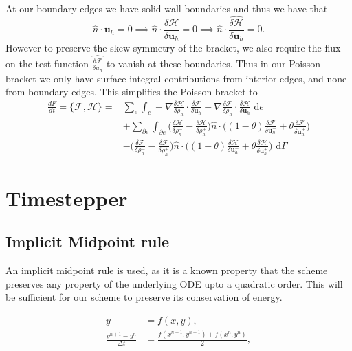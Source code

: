 \documentclass[a4paper,11pt]{article}
\begin{document}
 At our boundary edges we have solid wall boundaries and thus we have that 
\[\hat{\underline{n}} \cdot \mathbf{u}_h = 0 \implies  \hat{\underline{n}} \cdot \frac{\delta  \mathcal{H}}{\delta \mathbf{u}_h}= 0 \implies  \hat{\underline{n}} \cdot \widehat{\frac{\delta  \mathcal{H}}{\delta \mathbf{u}_h}} = 0.\]
However to preserve the skew symmetry of the bracket, we also require the flux on the test function $  \widehat{\frac{\delta  \mathcal{F}}{\delta u_h}}$ to vanish at these boundaries. Thus in our Poisson bracket we only have surface integral contributions from interior edges, and none from boundary edges.
 This simplifies the Poisson bracket to 
 \begin{equation}\label{eqns:discretepb}
\begin{aligned}
\frac{dF}{dt} =  \{ \mathcal{F},  \mathcal{H}\} = &  \sum_e \int_e - \nabla \frac{\delta  \mathcal{H}}{\delta \rho_h}\cdot \frac{\delta  \mathcal{F}}{\delta \mathbf{u}_h} + \nabla \frac{\delta  \mathcal{F}}{\delta \rho_h}\cdot \frac{\delta  \mathcal{H}}{\delta \mathbf{u}_h} \text{ d}e \\
 &+ \sum_{\partial e} \int_{\partial e } \bigg(  \frac{\delta  \mathcal{H}}{\delta \rho_h^-} -\frac{\delta  \mathcal{H}}{\delta \rho_h^+}\bigg)\hat{\underline{n}} \cdot\bigg ( (1-\theta) \frac{\delta  \mathcal{F}}{\delta  \mathbf{u}_h^-}+ \theta\frac{\delta  \mathcal{F}}{\delta  \mathbf{u}_h^+} \bigg)\\
 & - \bigg(  \frac{\delta  \mathcal{F}}{\delta \rho_h^-} -\frac{\delta  \mathcal{F}}{\delta \rho_h^+}\bigg)\hat{\underline{n}} \cdot\bigg ( (1-\theta) \frac{\delta  \mathcal{H}}{\delta  \mathbf{u}_h^-}+ \theta\frac{\delta  \mathcal{H}}{\delta  \mathbf{u}_h^+} \bigg) \text{ d} \Gamma 
 \end{aligned}
 \end{equation}



\section{Timestepper}
\subsection{Implicit Midpoint rule}
An implicit midpoint rule is used, as it is a known property that the scheme preserves any property of the underlying ODE upto a quadratic order. This will be sufficient for our scheme to preserve its conservation of energy.

\begin{equation} \begin{aligned} \dot {y} &= f(x,y),\\
\frac{y^{n+1}- y^n}{\Delta t} &= \frac{ f(x^{n+1}, y^{n+1}) + f(x^n, y^n)}{2}, \end{aligned}\end{equation}
\end{document}
